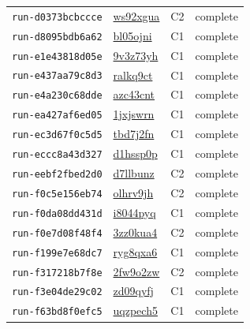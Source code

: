 \begin{longtable}{llll}
\texttt{run-d0373bcbccce} & \href{https://forge.coreweave.com/wandb/lbxa-corp/collusion-benchmark/runs/ws92xgua}{ws92xgua} & C2 & complete \\
\texttt{run-d8095bdb6a62} & \href{https://forge.coreweave.com/wandb/lbxa-corp/collusion-benchmark/runs/bl05ojni}{bl05ojni} & C1 & complete \\
\texttt{run-e1e43818d05e} & \href{https://forge.coreweave.com/wandb/lbxa-corp/collusion-benchmark/runs/9v3z73yh}{9v3z73yh} & C1 & complete \\
\texttt{run-e437aa79c8d3} & \href{https://forge.coreweave.com/wandb/lbxa-corp/collusion-benchmark/runs/ralkq9ct}{ralkq9ct} & C1 & complete \\
\texttt{run-e4a230c68dde} & \href{https://forge.coreweave.com/wandb/lbxa-corp/collusion-benchmark/runs/azc43cnt}{azc43cnt} & C1 & complete \\
\texttt{run-ea427af6ed05} & \href{https://forge.coreweave.com/wandb/lbxa-corp/collusion-benchmark/runs/1jxjswrn}{1jxjswrn} & C1 & complete \\
\texttt{run-ec3d67f0c5d5} & \href{https://forge.coreweave.com/wandb/lbxa-corp/collusion-benchmark/runs/tbd7j2fn}{tbd7j2fn} & C1 & complete \\
\texttt{run-eccc8a43d327} & \href{https://forge.coreweave.com/wandb/lbxa-corp/collusion-benchmark/runs/d1hssp0p}{d1hssp0p} & C1 & complete \\
\texttt{run-eebf2fbed2d0} & \href{https://forge.coreweave.com/wandb/lbxa-corp/collusion-benchmark/runs/d7llbunz}{d7llbunz} & C2 & complete \\
\texttt{run-f0c5e156eb74} & \href{https://forge.coreweave.com/wandb/lbxa-corp/collusion-benchmark/runs/olhrv9jh}{olhrv9jh} & C2 & complete \\
\texttt{run-f0da08dd431d} & \href{https://forge.coreweave.com/wandb/lbxa-corp/collusion-benchmark/runs/i8044pyq}{i8044pyq} & C1 & complete \\
\texttt{run-f0e7d08f48f4} & \href{https://forge.coreweave.com/wandb/lbxa-corp/collusion-benchmark/runs/3zz0kua4}{3zz0kua4} & C2 & complete \\
\texttt{run-f199e7e68dc7} & \href{https://forge.coreweave.com/wandb/lbxa-corp/collusion-benchmark/runs/ryg8qxa6}{ryg8qxa6} & C1 & complete \\
\texttt{run-f317218b7f8e} & \href{https://forge.coreweave.com/wandb/lbxa-corp/collusion-benchmark/runs/2fw9o2zw}{2fw9o2zw} & C2 & complete \\
\texttt{run-f3e04de29c02} & \href{https://forge.coreweave.com/wandb/lbxa-corp/collusion-benchmark/runs/zd09qyfj}{zd09qyfj} & C1 & complete \\
\texttt{run-f63bd8f0efc5} & \href{https://forge.coreweave.com/wandb/lbxa-corp/collusion-benchmark/runs/uqzpech5}{uqzpech5} & C1 & complete \\
\bottomrule
\end{longtable}

